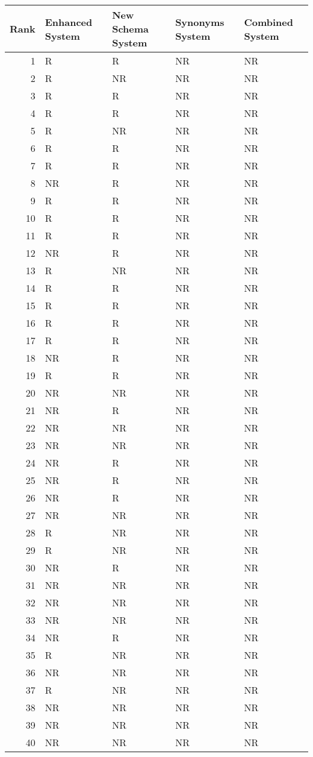 \begin{tabular}{rllll}
\toprule
Rank & Enhanced System & New Schema System & Synonyms System & Combined System \\
\midrule
1 & R & R & NR & NR \\
2 & R & NR & NR & NR \\
3 & R & R & NR & NR \\
4 & R & R & NR & NR \\
5 & R & NR & NR & NR \\
6 & R & R & NR & NR \\
7 & R & R & NR & NR \\
8 & NR & R & NR & NR \\
9 & R & R & NR & NR \\
10 & R & R & NR & NR \\
11 & R & R & NR & NR \\
12 & NR & R & NR & NR \\
13 & R & NR & NR & NR \\
14 & R & R & NR & NR \\
15 & R & R & NR & NR \\
16 & R & R & NR & NR \\
17 & R & R & NR & NR \\
18 & NR & R & NR & NR \\
19 & R & R & NR & NR \\
20 & NR & NR & NR & NR \\
21 & NR & R & NR & NR \\
22 & NR & NR & NR & NR \\
23 & NR & NR & NR & NR \\
24 & NR & R & NR & NR \\
25 & NR & R & NR & NR \\
26 & NR & R & NR & NR \\
27 & NR & NR & NR & NR \\
28 & R & NR & NR & NR \\
29 & R & NR & NR & NR \\
30 & NR & R & NR & NR \\
31 & NR & NR & NR & NR \\
32 & NR & NR & NR & NR \\
33 & NR & NR & NR & NR \\
34 & NR & R & NR & NR \\
35 & R & NR & NR & NR \\
36 & NR & NR & NR & NR \\
37 & R & NR & NR & NR \\
38 & NR & NR & NR & NR \\
39 & NR & NR & NR & NR \\
40 & NR & NR & NR & NR \\
\bottomrule
\end{tabular}
